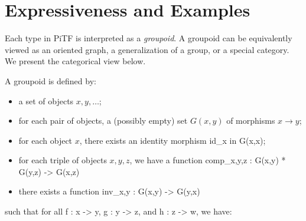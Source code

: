 \documentclass{llncs}
\newcommand{\roshan}[1]{\textsc{Roshan says:} 
  \textit{#1}
}
\begin{document}




\section{Expressiveness and Examples} 

Each type in {{PiTF}} is interpreted as a \emph{groupoid}. A groupoid can be
equivalently viewed as an oriented graph, a generalization of a group, or a
special category. We present the categorical view below.

A groupoid is defined by:
\begin{itemize}
\item a set of objects $x,y,\ldots$;
\item for each pair of objects, a (possibly empty) set $G(x,y)$ of morphisms
  $x \rightarrow y$; 
\item for each object $x$, there exists an identity morphism {{id_x in G(x,x)}};
\item for each triple of objects $x,y,z$, we have a function 
{{comp_{x,y,z} : G(x,y) * G(y,z) -> G(x,z)}}
\item there exists a function {{inv_{x,y} : G(x,y) -> G(y,x)}}
\end{itemize}
such that for all {{f : x -> y}}, {{g : y -> z}}, and {{h : z -> w}}, we have:
\end{document}

